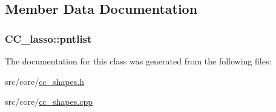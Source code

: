 \subsection{Member Data Documentation}
\hypertarget{a00033_aa2fba003c26aa52be0c935482a86ce5b}{
\subsubsection[{pntlist}]{ C\-C\-\_\-lasso\-::pntlist\hspace{0.3cm}{\ttfamily [private]}}}\label{a00033_aa2fba003c26aa52be0c935482a86ce5b}


The documentation for this class was generated from the following files\-:\begin{DoxyCompactItemize}
\item 
src/core/\hyperlink{a00210}{cc\-\_\-shapes.\-h}\item 
src/core/\hyperlink{a00209}{cc\-\_\-shapes.\-cpp}\end{DoxyCompactItemize}
